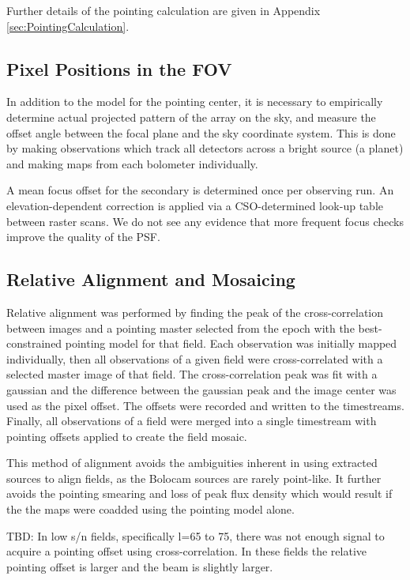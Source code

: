 \documentclass[12pt,preprint]{aastex}
\begin{document}
Further details of the pointing calculation are given in Appendix
\ref{sec:PointingCalculation}.

\subsection{Pixel Positions in the FOV}

In addition to the model for the pointing center, it is necessary to
empirically determine actual projected pattern of the array on the
sky, and measure the offset angle between the focal plane and the sky
coordinate system.  This is done by making observations which track
all detectors across a bright source (a planet) and making maps from each
bolometer individually.

A mean focus offset for the secondary is determined once per observing
run.  An elevation-dependent correction is applied via a
CSO-determined look-up table between raster scans.  We do not see any
evidence that more frequent focus checks improve the quality of the
PSF.

\subsection{Relative Alignment and Mosaicing}

Relative alignment was performed by finding the peak of the
cross-correlation between images and a pointing master selected from
the epoch with the best-constrained pointing model for that
field. Each observation was initially mapped individually, then all
observations of a given field were cross-correlated with a selected
master image of that field. The cross-correlation peak was fit with a
gaussian and the difference between the gaussian peak and the image
center was used as the pixel offset. The offsets were recorded and
written to the timestreams. Finally, all observations of a field were
merged into a single timestream with pointing offsets applied to
create the field mosaic.

This method of alignment avoids the ambiguities inherent in using
extracted sources to align fields, as the Bolocam sources are rarely
point-like.  It further avoids the pointing smearing and loss of peak
flux density which would result if the the maps were coadded using the
pointing model alone.

TBD: In low s/n fields, specifically l=65 to 75, there was not enough signal to
acquire a pointing offset using cross-correlation.  In these fields the
relative pointing offset is larger and the beam is slightly larger.
\end{document}
